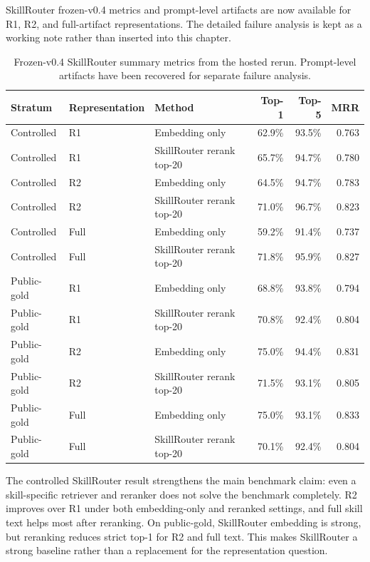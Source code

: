 SkillRouter frozen-v0.4 metrics and prompt-level artifacts are now available for R1, R2, and full-artifact representations. The detailed failure analysis is kept as a working note rather than inserted into this chapter.

\begin{table}[h]
\centering
\scriptsize
\begin{tabular}{p{}p{}p{}rrr}
\toprule
Stratum & Representation & Method & Top-1 & Top-5 & MRR \\
\midrule
Controlled & R1 & Embedding only & 62.9\% & 93.5\% & 0.763 \\
Controlled & R1 & SkillRouter rerank top-20 & 65.7\% & 94.7\% & 0.780 \\
Controlled & R2 & Embedding only & 64.5\% & 94.7\% & 0.783 \\
Controlled & R2 & SkillRouter rerank top-20 & 71.0\% & 96.7\% & 0.823 \\
Controlled & Full & Embedding only & 59.2\% & 91.4\% & 0.737 \\
Controlled & Full & SkillRouter rerank top-20 & 71.8\% & 95.9\% & 0.827 \\
\midrule
Public-gold & R1 & Embedding only & 68.8\% & 93.8\% & 0.794 \\
Public-gold & R1 & SkillRouter rerank top-20 & 70.8\% & 92.4\% & 0.804 \\
Public-gold & R2 & Embedding only & 75.0\% & 94.4\% & 0.831 \\
Public-gold & R2 & SkillRouter rerank top-20 & 71.5\% & 93.1\% & 0.805 \\
Public-gold & Full & Embedding only & 75.0\% & 93.1\% & 0.833 \\
Public-gold & Full & SkillRouter rerank top-20 & 70.1\% & 92.4\% & 0.804 \\
\bottomrule
\end{tabular}
\caption{Frozen-v0.4 SkillRouter summary metrics from the hosted rerun. Prompt-level artifacts have been recovered for separate failure analysis.}
\label{tab:skillrouter-v04-summary}
\end{table}

The controlled SkillRouter result strengthens the main benchmark claim: even a skill-specific retriever and reranker does not solve the benchmark completely. R2 improves over R1 under both embedding-only and reranked settings, and full skill text helps most after reranking. On public-gold, SkillRouter embedding is strong, but reranking reduces strict top-1 for R2 and full text. This makes SkillRouter a strong baseline rather than a replacement for the representation question.

